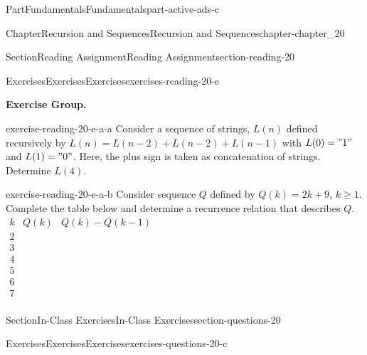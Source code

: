 \documentclass[oneside,10pt,]{book}
\numberwithin{equation}{section}
\begin{document}
\begin{partptx}{Part}{Fundamentals}{}{Fundamentals}{}{}{part-active-ads-c}
\begin{chapterptx}{Chapter}{Recursion and Sequences}{}{Recursion and Sequences}{}{}{chapter-chapter_20}
\begin{sectionptx}{Section}{Reading Assignment}{}{Reading Assignment}{}{}{section-reading-20}
%
%
\typeout{************************************************}
\typeout{************************************************}
%
\begin{exercises-subsection-numberless}{Exercises}{Exercises}{}{Exercises}{}{}{exercises-reading-20-e}
\par\medskip\noindent%
\textbf{Exercise Group.}\space\space%
\begin{exercisegroup}
\begin{divisionexerciseeg}{1}{}{}{exercise-reading-20-e-a-a}%
Consider a sequence of strings, \(L(n)\) defined recursively by \(L(n)=L(n-2)+L(n-2)+L(n-1)\) with \(L(0)="1"\) and \(L(1)="0"\). Here, the plus sign is taken as concatenation of strings.  Determine \(L(4)\).%
\end{divisionexerciseeg}%
\begin{divisionexerciseeg}{2}{}{}{exercise-reading-20-e-a-b}%
Consider sequence \(Q\) defined by \(Q(k) = 2k + 9\), \(k \geq  1\). Complete the table below and determine a recurrence relation that describes \(Q\). \(\begin{array}{c|c|c}
k & Q(k)  & Q(k)-Q(k-1) \\
\hline
2 &   &   \\
3 &   &   \\
4 & \text{  } &   \\
5 &   &   \\
6 &   &   \\
7 &   &   \\
\end{array}\)%
\end{divisionexerciseeg}%
\end{exercisegroup}
\par\medskip\noindent
\end{exercises-subsection-numberless}
\end{sectionptx}
%
%
\typeout{************************************************}
\typeout{************************************************}
%
\begin{sectionptx}{Section}{In-Class Exercises}{}{In-Class Exercises}{}{}{section-questions-20}
%
%
%
\typeout{************************************************}
\typeout{************************************************}
%
\begin{exercises-subsection-numberless}{Exercises}{Exercises}{}{Exercises}{}{}{exercises-questions-20-c}
\par\medskip\noindent%

\end{exercises-subsection-numberless}
\end{sectionptx}
\end{chapterptx}
\end{partptx}
\end{document}
